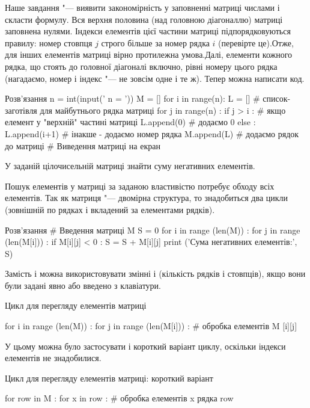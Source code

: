 Наше завдання "--- виявити закономірність у заповненні матриці числами і скласти формулу. Вся верхня половина (над головною діагоналлю) матриці заповнена нулями. Індекси елементів цієї частини матриці підпорядковуються правилу: номер стовпця $ j $ строго більше за номер рядка $ i $ (перевірте це).Отже, для інших елементів матриці вірно протилежна умова.Далі, елементи кожного рядка, що стоять до головної діагоналі включно, рівні номеру цього рядка (нагадаємо, номер і індекс "--- не зовсім одне і те ж). Тепер можна написати код.

\begin{py}{Розв'язання}
n = int(input(' n = '))
M = []
for i in range(n):
L = [] # список-заготівля для майбутнього рядка матриці
    for j in range(n) :
        if j > i : # якщо елемент у "верхній" частині матриці
            L.append(0) # додаємо 0
        else :
            L.append(i+1) # інакше - додаємо номер рядка
    M.append(L) # додаємо рядок до матриці
# Виведення матриці на екран
\end{py}

\begin{pr}{}
У заданій цілочисельній матриці знайти суму негативних елементів.
\end{pr}

Пошук елементів у матриці за заданою властивістю потребує обходу всіх елементів. Так як матриця "--- двомірна структура, то знадобиться два цикли (зовнішній по рядках і вкладений за елементами рядків).

\begin{py}{Розв'язання}
# Введення матриці M
S = 0
for i in range (len(M)) :
    for j in range (len(M[i])) :
        if M[i][j] < 0 :
            S = S + M[i][j]
print ('Сума негативних елементів:', S)
\end{py}
\noindent Замість  і \mi{len(M [i))} можна використовувати змінні  і  (кількість рядків і стовпців), якщо вони були задані явно або введено з клавіатури.

\begin{defn}{Цикл для перегляду елементів матриці}
\begin{py}{}
for i in range (len(M)) :
    for j in range (len(M[i])) :
        # обробка елементів M [i][j]
\end{py}
\end{defn}

У цьому можна було застосувати і короткий варіант циклу, оскільки індекси елементів не знадобилися.

\begin{defn}{Цикл для перегляду елементів матриці: короткий варіант}
\begin{py}{}
for row in M :
    for x in row :
        # обробка елементів x рядка row
\end{py}
\end{defn}

